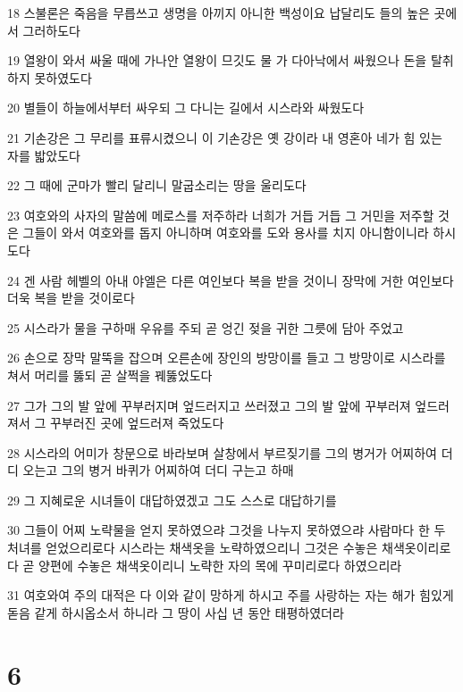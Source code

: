\par 18 스불론은 죽음을 무릅쓰고 생명을 아끼지 아니한 백성이요 납달리도 들의 높은 곳에서 그러하도다
\par 19 열왕이 와서 싸울 때에 가나안 열왕이 므깃도 물 가 다아낙에서 싸웠으나 돈을 탈취하지 못하였도다
\par 20 별들이 하늘에서부터 싸우되 그 다니는 길에서 시스라와 싸웠도다
\par 21 기손강은 그 무리를 표류시켰으니 이 기손강은 옛 강이라 내 영혼아 네가 힘 있는 자를 밟았도다
\par 22 그 때에 군마가 빨리 달리니 말굽소리는 땅을 울리도다
\par 23 여호와의 사자의 말씀에 메로스를 저주하라 너희가 거듭 거듭 그 거민을 저주할 것은 그들이 와서 여호와를 돕지 아니하며 여호와를 도와 용사를 치지 아니함이니라 하시도다
\par 24 겐 사람 헤벨의 아내 야엘은 다른 여인보다 복을 받을 것이니 장막에 거한 여인보다 더욱 복을 받을 것이로다
\par 25 시스라가 물을 구하매 우유를 주되 곧 엉긴 젖을 귀한 그릇에 담아 주었고
\par 26 손으로 장막 말뚝을 잡으며 오른손에 장인의 방망이를 들고 그 방망이로 시스라를 쳐서 머리를 뚫되 곧 살쩍을 꿰뚫었도다
\par 27 그가 그의 발 앞에 꾸부러지며 엎드러지고 쓰러졌고 그의 발 앞에 꾸부러져 엎드러져서 그 꾸부러진 곳에 엎드러져 죽었도다
\par 28 시스라의 어미가 창문으로 바라보며 살창에서 부르짖기를 그의 병거가 어찌하여 더디 오는고 그의 병거 바퀴가 어찌하여 더디 구는고 하매
\par 29 그 지혜로운 시녀들이 대답하였겠고 그도 스스로 대답하기를
\par 30 그들이 어찌 노략물을 얻지 못하였으랴 그것을 나누지 못하였으랴 사람마다 한 두 처녀를 얻었으리로다 시스라는 채색옷을 노략하였으리니 그것은 수놓은 채색옷이리로다 곧 양편에 수놓은 채색옷이리니 노략한 자의 목에 꾸미리로다 하였으리라
\par 31 여호와여 주의 대적은 다 이와 같이 망하게 하시고 주를 사랑하는 자는 해가 힘있게 돋음 같게 하시옵소서 하니라 그 땅이 사십 년 동안 태평하였더라

\chapter{6}

